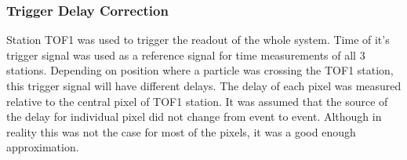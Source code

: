 \subsubsection{Trigger Delay Correction}

\newcommand{\Tdelay}[2]{\ensuremath{T_{\text{tr}}^{#1,#2}}}
\newcommand{\TW}{\ensuremath{\text{TW}}}
\newcommand{\PMT}{\ensuremath{\text{PMT}}}
\newcommand{\ttrig}[2]{\ensuremath{{t}_{#2}^{#1}}}
\newcommand{\mean}[1]{\ensuremath{\left< #1 \right>}}


Station TOF1 was used to trigger the readout of the whole system. Time
of it's trigger signal was used as a reference signal for time
measurements of all 3 stations. Depending on position where a particle
was crossing the TOF1 station, this trigger signal will have different
delays. The delay of each pixel was measured relative to the central
pixel of TOF1 station. It was assumed that the source of the delay for
individual pixel did not change from event to event. Although in
reality this was not the case for most of the pixels, it was a good
enough approximation.

